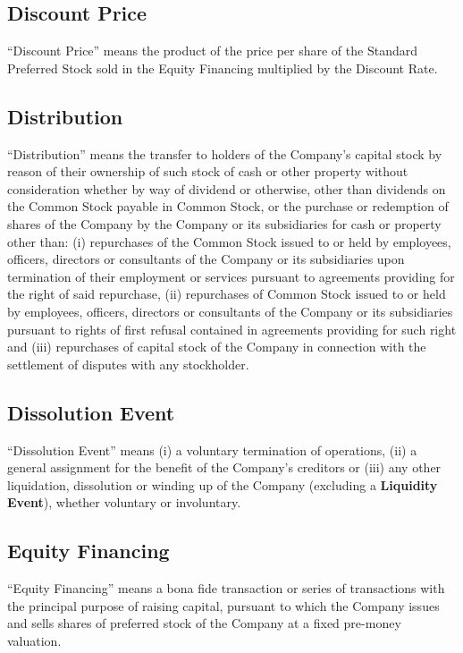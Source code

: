 \documentclass[12pt,letterpaper,fullpage]{article}
\begin{document}
\subsection{Discount Price}
\label{sec:discountprice}

“Discount Price” means the product of the price per share of the
Standard Preferred Stock sold in the Equity Financing multiplied by
the Discount Rate.

\subsection{Distribution}
\label{sec:distribution}

“Distribution” means the transfer to holders of the Company’s capital
stock by reason of their ownership of such stock of cash or other
property without consideration whether by way of dividend or
otherwise, other than dividends on the Common Stock payable in Common
Stock, or the purchase or redemption of shares of the Company by the
Company or its subsidiaries for cash or property other than: (i)
repurchases of the Common Stock issued to or held by employees,
officers, directors or consultants of the Company or its subsidiaries
upon termination of their employment or services pursuant to
agreements providing for the right of said repurchase, (ii)
repurchases of Common Stock issued to or held by employees, officers,
directors or consultants of the Company or its subsidiaries pursuant
to rights of first refusal contained in agreements providing for such
right and (iii) repurchases of capital stock of the Company in
connection with the settlement of disputes with any stockholder.

\subsection{Dissolution Event}
\label{sec:dissolutioneventdef}

“Dissolution Event” means (i) a voluntary termination of operations,
(ii) a general assignment for the benefit of the Company’s creditors
or (iii) any other liquidation, dissolution or winding up of the
Company (excluding a \textbf{Liquidity Event}), whether voluntary or
involuntary.

\subsection{Equity Financing}
\label{sec:equityfinancingdef}

\begin{sloppypar}
“Equity Financing” means a bona fide transaction or series of
transactions with the principal purpose of raising capital, pursuant
to which the Company issues and sells shares of preferred stock of the
Company at a fixed pre-money valuation.
\end{sloppypar}
\end{document}
